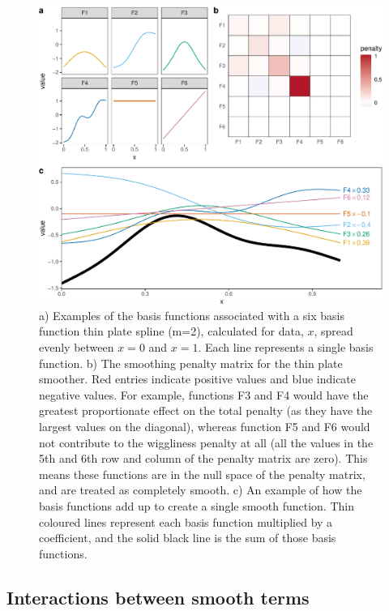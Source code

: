 \documentclass[12pt]{article}
\begin{document}
\begin{figure}
\includegraphics[width=\linewidth]{../figures/basis_function_examples-1} \caption{\label{fig:basis_example}a) Examples of the basis functions associated with a six basis function thin plate spline (m=2), calculated for data, $x$, spread evenly between $x=0$ and $x=1$. Each line represents a single basis function. b) The smoothing  penalty matrix for the thin plate smoother. Red entries indicate positive values and blue indicate negative values.  For example, functions F3 and F4 would have the greatest proportionate effect on the total penalty (as they have the largest values on the diagonal), whereas function F5 and F6 would not contribute to the wiggliness penalty at all (all the values in the 5th and 6th row and column of the penalty matrix are zero). This means these functions are in the null space of the penalty matrix, and are treated as completely smooth. c) An example of how the basis functions add up to create a single smooth function. Thin coloured lines represent each basis function multiplied by a coefficient, and the solid black line is the sum of those basis functions.}\label{fig:basis_function_examples}
\end{figure}

\subsection{Interactions between smooth
terms}\label{interactions-between-smooth-terms}
\end{document}
